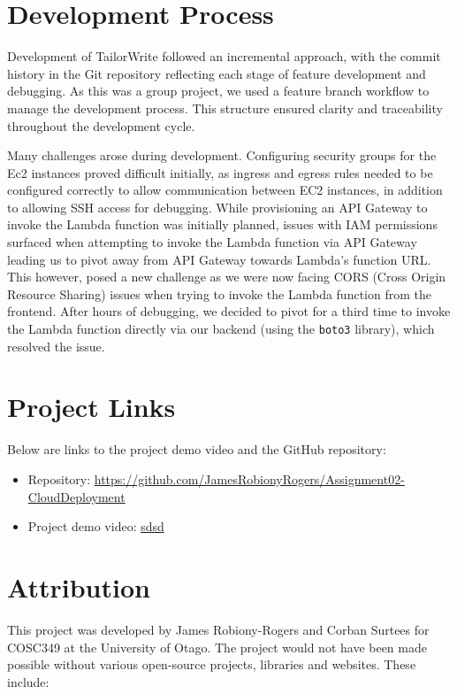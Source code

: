 \documentclass[a4paper, 11pt]{article}
\newcommand{\projectRepoURL}{https://github.com/JamesRobionyRogers/Assignment02-CloudDeployment}
\newcommand{\projectDemoVideoURL}{sdsd}
\newcommand{\estimatedCostInUseURL}{https://calculator.aws/\#/estimate?id=b4dc230cd3bee2c549dd81bb9eece77d7a694213}
\begin{document}

\section{Development Process}

Development of TailorWrite followed an incremental approach, with the commit history in the Git repository reflecting each stage of feature development and debugging. As this was a group project, we used a feature branch workflow to manage the development process. This structure ensured clarity and traceability throughout the development cycle.

Many challenges arose during development. Configuring security groups for the Ec2 instances proved difficult initially, as ingress and egress rules needed to be configured correctly to allow communication between EC2 instances, in addition to allowing SSH access for debugging. While provisioning an API Gateway to invoke the Lambda function was initially planned, issues with IAM permissions surfaced when attempting to invoke the Lambda function via API Gateway leading us to pivot away from API Gateway towards Lambda's function URL. This however, posed a new challenge as we were now facing CORS (Cross Origin Resource Sharing) issues when trying to invoke the Lambda function from the frontend. After hours of debugging, we decided to pivot for a third time to invoke the Lambda function directly via our backend (using the \texttt{boto3} library), which resolved the issue.

\section{Project Links}
Below are links to the project demo video and the GitHub repository:

\begin{itemize}
    \item Repository: \url{\projectRepoURL}
    \item Project demo video: \url{\projectDemoVideoURL}
\end{itemize}

\section{Attribution}
This project was developed by James Robiony-Rogers and Corban Surtees for COSC349 at the University of Otago. The project would not have been made possible without various open-source projects, libraries and websites. These include: 
\end{document}
